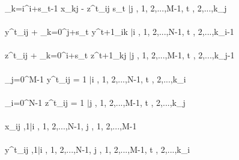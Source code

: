 \documentclass[a4paper]{memoir}
\begin{document}
        \sum \limits_{{k=i}}^{i+s_{t}-1} x_{kj} - z^{t}_{ij} \times s_{t}  $ | $\forall j \in {}, 1, 2,...,M-1\rbrace, \forall t \in {}, 2,...,k_{j}\rbrace\\\\
        
        y^{t}_{ij} + \sum \limits_{{k=0}}^{j+s_{t}} y^{t+1}_{ik}  $ | $\forall i \in {}, 1, 2,...,N-1\rbrace, \forall t \in {}, 2,...,k_{i}-1\rbrace\\\\
        
        z^{t}_{ij} + \sum \limits_{{k=0}}^{i+s_{t}} z^{t+1}_{kj} $ | $\forall j \in {}, 1, 2,...,M-1\rbrace, \forall t \in {}, 2,...,k_{j}-1\rbrace\\\\
        
        \sum \limits_{{j=0}}^{M-1} y^{t}_{ij} = 1 $ | $\forall i \in {}, 1, 2,...,N-1\rbrace, \forall t \in {}, 2,...,k_{i}\rbrace\\\\
        
        \sum \limits_{{i=0}}^{N-1} z^{t}_{ij} = 1 $ | $\forall j \in {}, 1, 2,...,M-1\rbrace, \forall t \in {}, 2,...,k_{j}\rbrace\\\\



        
        
        
      x_{ij} \in {},1\rbrace$ | $\forall i \in {}, 1, 2,...,N-1\rbrace, \forall j \in {}, 1, 2,...,M-1\rbrace\\\\
      
      y^{t}_{ij} \in {},1\rbrace $ | $\forall i \in {}, 1, 2,...,N-1\rbrace, \forall j \in {}, 1, 2,...,M-1\rbrace, \forall t \in {}, 2,...,k_{i}\rbrace\\\\
      
\end{document}

